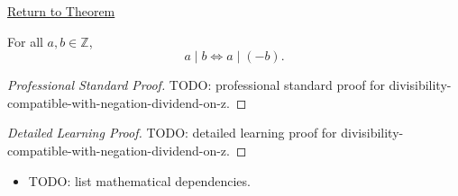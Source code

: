 \newpage
{}
\label{prf:divisibility-compatible-with-negation-dividend-on-z}

\begin{remark*}[Return]
\hyperref[prop:divisibility-compatible-with-negation-dividend-on-z]{Return to Theorem}
\end{remark*}

\begin{proposition*}
For all $a,b\in\mathbb{Z}$,
\[
a\mid b \Longleftrightarrow a\mid(-b).
\]
\end{proposition*}

\begin{proof}[Professional Standard Proof]
\LRAProofBodyStart
TODO: professional standard proof for divisibility-compatible-with-negation-dividend-on-z.
\end{proof}

\begin{proof}[Detailed Learning Proof]
\LRAProofBodyStart
TODO: detailed learning proof for divisibility-compatible-with-negation-dividend-on-z.
\end{proof}

\begin{remark*}
\end{remark*}

\begin{dependencies}
\begin{itemize}
  \item TODO: list mathematical dependencies.
\end{itemize}
\end{dependencies}

\clearpage
